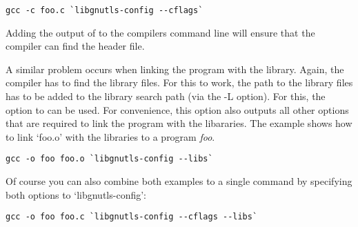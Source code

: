 \begin{verbatim}
gcc -c foo.c `libgnutls-config --cflags`
\end{verbatim}

Adding the output of  to the compilers
command line will ensure that the compiler can find the \gnutls{} header
file.

A similar problem occurs when linking the program with the library.
Again, the compiler has to find the library files.  For this to work,
the path to the library files has to be added to the library search
path (via the -L option).  For this, the option
 to  can be used.  For
convenience, this option also outputs all other options that are
required to link the program with the \gnutls{} libararies.
The example shows how to link `foo.o'
with the \gnutls{} libraries to a program \emph{foo}.

\begin{verbatim}
gcc -o foo foo.o `libgnutls-config --libs`
\end{verbatim}

Of course you can also combine both examples to a single command by
specifying both options to `libgnutls-config':

\begin{verbatim}
gcc -o foo foo.c `libgnutls-config --cflags --libs`
\end{verbatim}

